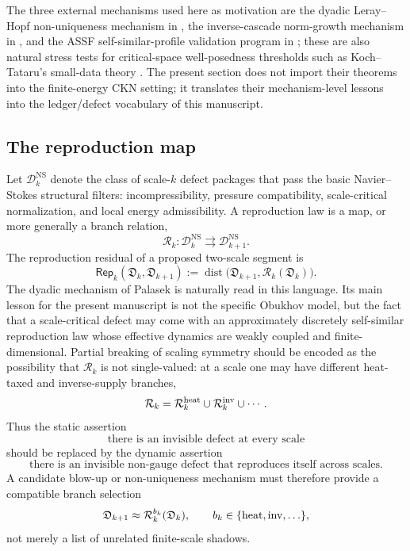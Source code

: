 \documentclass[11pt]{article}
\numberwithin{equation}{section}
\newcommand{\NS}{\mathrm{NS}}
\newcommand{\calD}{\mathcal D}
\newcommand{\calR}{\mathcal R}
\newcommand{\Rep}{\mathsf{Rep}}
\newcommand{\Dist}{\operatorname{dist}}
\begin{document}
The three external mechanisms used here as motivation are the dyadic Leray--Hopf non-uniqueness mechanism in \cite{PalasekDyadic2024}, the inverse-cascade norm-growth mechanism in \cite{PalasekNormGrowth2025}, and the ASSF self-similar-profile validation program in \cite{IonescuJiaPalasek2026}; these are also natural stress tests for critical-space well-posedness thresholds such as Koch--Tataru's small-data theory \cite{KochTataru2001}.  The present section does not import their theorems into the finite-energy CKN setting; it translates their mechanism-level lessons into the ledger/defect vocabulary of this manuscript.

\subsection*{The reproduction map}

Let $\calD_k^{\NS}$ denote the class of scale-$k$ defect packages that pass the basic Navier--Stokes structural filters: incompressibility, pressure compatibility, scale-critical normalization, and local energy admissibility.  A reproduction law is a map, or more generally a branch relation,
\begin{equation}\label{eq:reproduction-map}
    \calR_k:\calD_k^{\NS}\rightrightarrows \calD_{k+1}^{\NS}.
\end{equation}
The reproduction residual of a proposed two-scale segment is
\begin{equation}\label{eq:reproduction-residual}
    \Rep_k(\mathfrak D_k,\mathfrak D_{k+1})
    :=
    \Dist\bigl(\mathfrak D_{k+1},\calR_k(\mathfrak D_k)\bigr).
\end{equation}
The dyadic mechanism of Palasek \cite{PalasekDyadic2024} is naturally read in this language.  Its main lesson for the present manuscript is not the specific Obukhov model, but the fact that a scale-critical defect may come with an approximately discretely self-similar reproduction law whose effective dynamics are weakly coupled and finite-dimensional.  Partial breaking of scaling symmetry should be encoded as the possibility that $\calR_k$ is not single-valued: at a scale one may have different heat-taxed and inverse-supply branches,
\[
    \calR_k
    =
    \calR_k^{\rm heat}\cup \calR_k^{\rm inv}\cup \cdots .
\]
Thus the static assertion
\[
    \text{there is an invisible defect at every scale}
\]
should be replaced by the dynamic assertion
\[
    \text{there is an invisible non-gauge defect that reproduces itself across scales.}
\]
A candidate blow-up or non-uniqueness mechanism must therefore provide a compatible branch selection
\begin{equation}\label{eq:branch-selection}
    \mathfrak D_{k+1}\approx \calR_k^{b_k}(\mathfrak D_k),
    \qquad b_k\in\{\rm heat,inv,\ldots\},
\end{equation}
not merely a list of unrelated finite-scale shadows.
\end{document}
